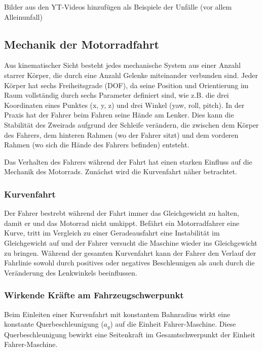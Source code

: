 Bilder aus den YT-Videos hinzufügen als Beispiele der Unfälle (vor allem Alleinunfall)


\subsection{Mechanik der Motorradfahrt} %
Aus kinematischer Sicht besteht jedes mechanische System aus einer Anzahl starrer Körper, die durch eine Anzahl Gelenke miteinander verbunden sind. Jeder Körper hat sechs Freiheitsgrade (DOF), da seine Position und Orientierung im Raum vollständig durch sechs Parameter definiert sind, wie z.B. die drei Koordinaten eines Punktes (x, y, z) und drei Winkel (yaw, roll, pitch).
In der Praxis hat der Fahrer beim Fahren seine Hände am Lenker. Dies kann die Stabilität des Zweirads aufgrund der Schleife verändern, die zwischen dem Körper des Fahrers, dem hinteren Rahmen (wo der Fahrer sitzt) und dem vorderen Rahmen (wo sich die Hände des Fahrers befinden) entsteht.\citep{Cossalter2014}

Das Verhalten des Fahrers während der Fahrt hat einen starken Einfluss auf die Mechanik des Motorrads. Zunächst wird die Kurvenfahrt näher betrachtet.

\subsubsection{Kurvenfahrt} 

Der Fahrer bestrebt während der Fahrt immer das Gleichgewicht zu halten, damit er und das Motorrad nicht umkippt.
Befährt ein Motorradfahrer eine Kurve, tritt im Vergleich zu einer Geradeausfahrt eine Instabilität im Gleichgewicht auf und der Fahrer versucht die Maschine wieder ins Gleichgewicht zu bringen. Während der gesamten Kurvenfahrt kann der Fahrer den Verlauf der Fahrlinie sowohl durch positives oder negatives Beschleunigen als auch durch die Veränderung des Lenkwinkels beeinflussen. \citep{Haedrich2012} 


\subsubsection{Wirkende Kräfte am Fahrzeugschwerpunkt}

Beim Einleiten einer Kurvenfahrt mit konstantem Bahnradius wirkt eine konstante Querbeschleunigung ($a_q$) auf die Einheit \glqq Fahrer-Maschine\grqq{}. Diese Querbeschleunigung bewirkt eine Seitenkraft im Gesamtschwerpunkt der Einheit \glqq Fahrer-Maschine\grqq{}. %

